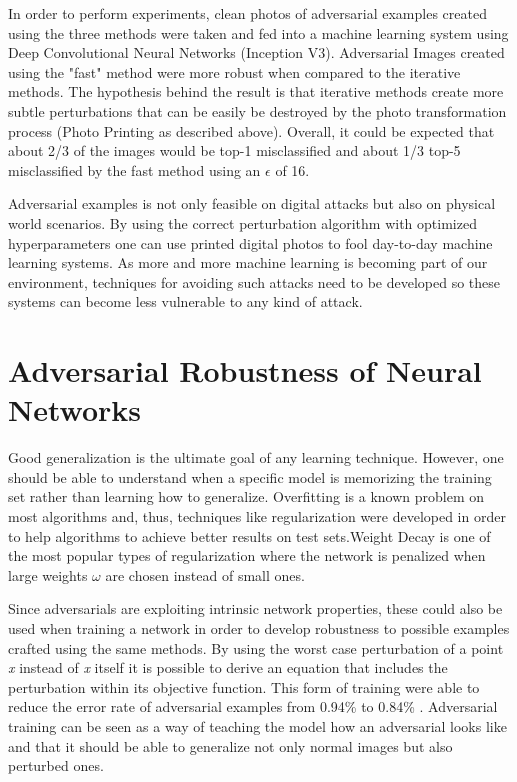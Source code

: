 \documentclass{article}
\begin{document}
In order to perform experiments, clean photos of adversarial examples created using the three methods were taken and fed into a machine learning system using Deep Convolutional Neural Networks (Inception V3). Adversarial Images created using the "fast" method were more robust when compared to the iterative methods. The hypothesis behind the result is that iterative methods create more subtle perturbations that can be easily be destroyed by the photo transformation process (Photo Printing as described above). Overall, it could be expected that about 2/3 of the images would be top-1 misclassified and about 1/3 top-5 misclassified by the fast method using an $\epsilon$ of 16.

Adversarial examples is not only feasible on digital attacks but also on physical world scenarios. By using the correct perturbation algorithm with optimized hyperparameters one can use printed digital photos to fool day-to-day machine learning systems. As more and more machine learning is becoming part of our environment, techniques for avoiding such attacks need to be developed so these systems can become less vulnerable to any kind of attack.

\section{Adversarial Robustness of Neural Networks}\label{sec:robustness}

Good generalization is the ultimate goal of any learning technique. However, one should be able to understand when a specific model is memorizing the training set rather than learning how to generalize. Overfitting is a known problem on most algorithms and, thus, techniques like regularization were developed in order to help algorithms to achieve better results on test sets.Weight Decay is one of the most popular types of regularization where the network is penalized when large weights $\omega$ are chosen instead of small ones.

Since adversarials are exploiting intrinsic network properties, these could also be used when training a network in order to develop robustness to possible examples crafted using the same methods. By using the worst case perturbation of a point \textit{x} instead of \textit{x} itself it is possible to derive an equation that includes the perturbation within its objective function. This form of training were able to reduce the error rate of adversarial examples from 0.94\% to 0.84\% \cite{goodfellow2014}. Adversarial training can be seen as a way of teaching the model how an adversarial looks like and that it should be able to generalize not only normal images but also perturbed ones.
\end{document}
